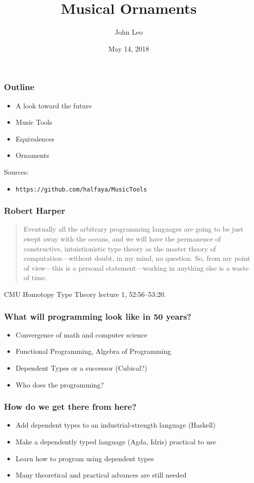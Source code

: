 \documentclass{beamer}
\title{Musical Ornaments}
\author{John Leo}
\institute{Halfaya Research}
\date{May 14, 2018}
\begin{document}
 
\frame{\titlepage}
 
\begin{frame}\frametitle{Outline}
\begin{itemize}
\item A look toward the future
\item Music Tools
\item Equivalences
\item Ornaments
\end{itemize}

\bigskip 
Sources:
\begin{itemize}
\item {\tt https://github.com/halfaya/MusicTools}
\end{itemize}
\end{frame}

\begin{frame}\frametitle{Robert Harper}
\begin{quote}
Eventually all the arbitrary programming languages are going to be just swept away with the oceans,
and we will have the permanence of constructive, intuistionistic type theory as the master theory
of computation---without doubt, in my mind, no question.  So, from my point of view---this is a personal
statement---working in anything else is a waste of time.
\end{quote}

CMU Homotopy Type Theory lecture 1, 52:56--53:20.
\end{frame}

\begin{frame}\frametitle{What will programming look like in 50 years?}
\begin{itemize}
\item Convergence of math and computer science
\item Functional Programming, Algebra of Programming
\item Dependent Types or a successor (Cubical?)
\item Who does the programming?
\end{itemize}
\end{frame}

\begin{frame}\frametitle{How do we get there from here?}
\begin{itemize}
\item Add dependent types to an industrial-strength language (Haskell)
\item Make a dependently typed language (Agda, Idris) practical to use
\item Learn how to program using dependent types
\item Many theoretical and practical advances are still needed
\end{itemize}
\end{frame}
\end{document}
